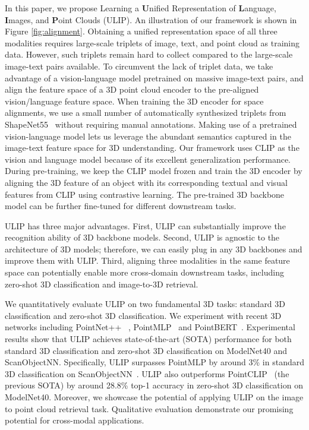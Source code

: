 \documentclass[10pt,twocolumn,letterpaper]{article}
\begin{document}
In this paper, we propose Learning a \textbf{U}nified Representation of \textbf{L}anguage, \textbf{I}mages, and \textbf{P}oint Clouds (ULIP). 
An illustration of our framework is shown in Figure \ref{fig:alignment}. 
Obtaining a unified representation space of all three modalities requires large-scale triplets of image, text, and point cloud as training data.
However, such triplets remain hard to collect compared to the large-scale image-text pairs available.
To circumvent the lack of triplet data, we take advantage of a vision-language model pretrained on massive image-text pairs, and align the feature space of a 3D point cloud encoder to the pre-aligned vision/language feature space. 
When training the 3D encoder for space alignments, we use a small number of automatically synthesized triplets from ShapeNet55~\cite{chang2015shapenet} without requiring manual annotations.
Making use of a pretrained vision-language model lets us leverage the abundant semantics captured in the image-text feature space for 3D understanding.
Our framework uses CLIP as the vision and language model because of its excellent generalization performance. During pre-training, we keep the CLIP model frozen and train the 3D encoder by aligning the 3D feature of an object with its corresponding textual and visual features from CLIP using contrastive learning.
The pre-trained 3D backbone model can be further fine-tuned for different downstream tasks.




ULIP has three major advantages. First, ULIP can substantially improve the recognition ability of 3D backbone models. Second, ULIP is agnostic to the architecture of 3D models; therefore, we can easily plug in any 3D backbones and improve them with ULIP. Third, aligning three modalities in the same feature space can potentially enable more cross-domain downstream tasks, including zero-shot 3D classification and image-to-3D retrieval.

We quantitatively evaluate ULIP on two fundamental 3D tasks: standard 3D classification and zero-shot 3D classification. We experiment with recent 3D networks including PointNet++ ~\cite{qi2017pointnet++}, PointMLP~\cite{ma2022rethinking} and PointBERT~\cite{yu2022point}. 
Experimental results show that ULIP achieves state-of-the-art (SOTA) performance for both standard 3D classification and zero-shot 3D classification on ModelNet40 and ScanObjectNN. Specifically, ULIP surpasses PointMLP by around 3\% in standard 3D classification on ScanObjectNN~\cite{Uy_2019_ICCV}. ULIP also outperforms PointCLIP~\cite{zhang2022pointclip} (the previous SOTA) by around 28.8\% top-1 accuracy in zero-shot 3D classification on ModelNet40. Moreover, we showcase the potential of applying ULIP on the image to point cloud retrieval task. Qualitative evaluation demonstrate our promising potential for cross-modal applications.
\end{document}
